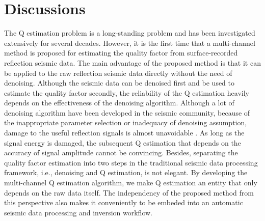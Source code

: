 \section{Discussions}
The Q estimation problem is a long-standing problem and has been investigated extensively for several decades. However, it is the first time that a multi-channel method is proposed for estimating the quality factor from surface-recorded reflection seismic data. The main advantage of the proposed method is that it can be applied to the raw reflection seismic data directly without the need of denoising. Although the seismic data can be denoised first and be used to estimate the quality factor secondly, the reliability of the Q estimation heavily depends on the effectiveness of the denoising algorithm. Although a lot of denoising algorithm have been developed in the seismic community, because of the inappropriate parameter selection or inadequacy of denoising assumption, damage to the useful reflection signals is almost unavoidable \cite[]{yangkang2015ortho}. As long as the signal energy is damaged, the subsequent Q estimation that depends on the accuracy of signal amplitude cannot be convincing. Besides, separating the quality factor estimation into two steps in the traditional seismic data processing framework, i.e., denoising and Q estimation, is not elegant. By developing the multi-channel Q estimation algorithm, we make Q estimation an entity that only depends on the raw data itself. The independency of the proposed method from this perspective also makes it conveniently to be embeded into an automatic seismic data processing and inversion workflow. 

